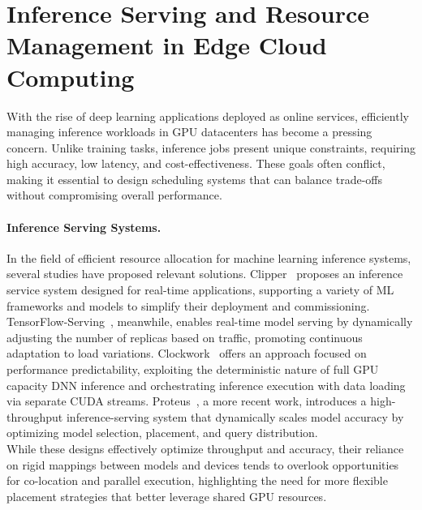 \section{Inference Serving and Resource Management in Edge Cloud Computing}\label{sec:inference_serving_and_resource_management_in_edge_cloud_computing}

With the rise of deep learning applications deployed as online services, efficiently managing inference workloads in GPU datacenters has become a pressing concern. Unlike training tasks, inference jobs present unique constraints, requiring high accuracy, low latency, and cost-effectiveness. These goals often conflict, making it essential to design scheduling systems that can balance trade-offs without compromising overall performance.

\paragraph{Inference Serving Systems.}
In the field of efficient resource allocation for machine learning inference systems, several studies have proposed relevant solutions. Clipper~\cite{2017clipper} proposes an inference service system designed for real-time applications, supporting a variety of ML frameworks and models to simplify their deployment and commissioning. TensorFlow-Serving~\cite{olston2017tensorflowserving}, meanwhile, enables real-time model serving by dynamically adjusting the number of replicas based on traffic, promoting continuous adaptation to load variations. Clockwork~\cite{gujarati2020servingdnnslikeclockwork} offers an approach focused on performance predictability, exploiting the deterministic nature of full GPU capacity DNN inference and orchestrating inference execution with data loading via separate CUDA streams. Proteus~\cite{ahmad2024proteus}, a more recent work, introduces a high-throughput inference-serving system that dynamically scales model accuracy by optimizing model selection, placement, and query distribution.\\
While these designs effectively optimize throughput and accuracy, their reliance on rigid mappings between models and devices tends to overlook opportunities for co-location and parallel execution, highlighting the need for more flexible placement strategies that better leverage shared GPU resources.

